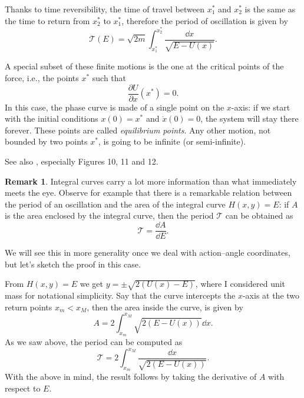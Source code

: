 \documentclass[english,fontsize=11pt,paper=b5]{scrbook}
\theoremstyle{definition}
\newtheorem{remark}{Remark}[chapter]
\begin{document}
    Thanks to time reversibility, the time of travel between $x_1^*$ and $x_2^*$ is the same as the time to return from $x_2^*$ to $x_1^*$, therefore the period of oscillation is given by
    \begin{equation}\label{eq:osc}
      \mathcal{T}(E) = \sqrt{2m} \int_{x^*_1}^{x^*_2} \frac{\dd x}{\sqrt{E-U(x)}}.
    \end{equation}

    A special subset of these finite motions is the one at the critical points of the force, i.e., the points $x^*$ such that
    \begin{equation}
      \frac{\partial U}{\partial x}(x^*) = 0.
    \end{equation}
    In this case, the phase curve is made of a single point on the $x$-axis: if we start with the initial conditions $x(0) = x^*$ and $\dot x(0) = 0$, the system will stay there forever. These points are called \emph{equilibrium points}.
    Any other motion, not bounded by two points $x^*$, is going to be infinite (or semi-infinite).

    See also \cite[Chapter 2.4]{book:arnold}, especially Figures 10, 11 and 12.

    \begin{remark}
      Integral curves carry a lot more information than what immediately meets the eye.
      Observe for example that there is a remarkable relation between the period of an oscillation and the area of the integral curve $H(x,y) = E$:
      if $A$ is the area enclosed by the integral curve, then the period $\mathcal{T}$ can be obtained as
      \begin{equation}
        \mathcal{T} = \frac{\dd A}{\dd E}.
      \end{equation}

      We will see this in more generality once we deal with action--angle coordinates, but let's sketch the proof in this case.

      From $H(x,y) = E$ we get $y = \pm \sqrt{2(U(x) - E)}$, where I considered unit mass for notational simplicity. Say that the curve intercepts the $x$-axis at the two return points $x_m < x_M$, then the area inside the curve, is given by
      \begin{equation}
        A = 2\int_{x_m}^{x_M}\sqrt{2(E - U(x))} \dd x.
      \end{equation}
      As we saw above, the period can be computed as
      \begin{equation}
        \mathcal{T} = 2\int_{x_m}^{x_M} \frac{\dd x}{\sqrt{2(E - U(x))}}.
      \end{equation}
      With the above in mind, the result follows by taking the derivative of $A$ with respect to $E$.
    \end{remark}
\end{document}

